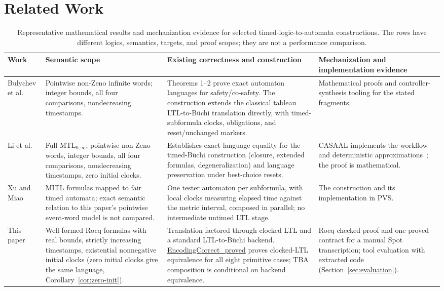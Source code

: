 \documentclass{ieeeaccess}
\newcommand{\Rocqid}[1]{\url{#1}}
\begin{document}
\section{Related Work}
\label{sec:related}
\begin{table}[!t]
\centering
\caption{Representative mathematical results and mechanization evidence for
selected timed-logic-to-automata constructions. The rows have different logics,
semantics, targets, and proof scopes; they are not a performance comparison.}
\label{tab:prior-construction-comparison}
\begin{tabular}{@{}p{}p{}p{}p{}@{}}
\toprule
Work & Semantic scope & Existing correctness and construction & Mechanization and implementation evidence\\
\midrule
Bulychev et al.~\cite{[BDLG14]} & Pointwise non-Zeno infinite words; integer bounds, all four comparisons, nondecreasing timestamps. & Theorems 1--2 prove exact automaton languages for safety/co-safety. The construction extends the classical tableau LTL-to-B\"uchi translation directly, with timed-subformula clocks, obligations, and reset/unchanged markers. & Mathematical proofs and controller-synthesis tooling for the stated fragments.\\
Li et al.~\cite{li_spin7} & Full MTL$_{0,\infty}$; pointwise non-Zeno words, integer bounds, all four comparisons, nondecreasing timestamps, zero initial clocks. & Establishes exact language equality for the timed-B\"uchi construction (closure, extended formulas, degeneralization) and language preservation under best-choice resets. & CASAAL implements the workflow and deterministic approximations~\cite{casaal_tool}; the proof is mathematical.\\
Xu and Miao~\cite{xu08} & MITL formulas mapped to fair timed automata; exact semantic relation to this paper's pointwise event-word model is not compared. & One tester automaton per subformula, with local clocks measuring elapsed time against the metric interval, composed in parallel; no intermediate untimed LTL stage. & The construction and its implementation in PVS.\\
This paper & Well-formed Rocq formulas with real bounds, strictly increasing timestamps, existential nonnegative initial clocks (zero initial clocks give the same
language, Corollary~\ref{cor:zero-init}). & Translation factored through clocked LTL and a standard LTL-to-B\"uchi backend. \Rocqid{EncodingCorrect_proved} proves clocked-LTL equivalence for all eight primitive cases; TBA composition is conditional on backend equivalence. & Rocq-checked proof and one proved contract for a manual Spot transcription; tool evaluation with extracted code (Section~\ref{sec:evaluation}).\\
\bottomrule
\end{tabular}
\end{table}
\end{document}
